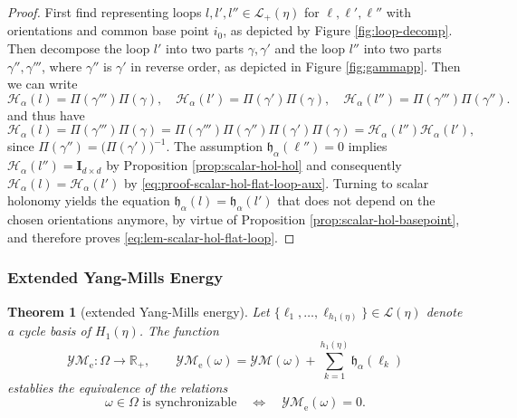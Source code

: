\documentclass[10pt,reqno]{amsart}
\numberwithin{equation}{section}
\theoremstyle{bfnote}
\newtheorem{theorem}{Theorem}[section]
\theoremstyle{bfdef}
\newcommand{\mc}[1]{\mathcal{#1}}
\newcommand{\R}{\mathbb{R}}
\newcommand{\II}{\mathbf{I}_{d \times d}}
\renewcommand\o\operatorname
\providecommand\a; %
\renewcommand{\a}{\alpha}
\providecommand\Hom; %
\renewcommand{\Hom}{H}
\providecommand\Hol; %
\renewcommand{\Hol}{\mc{H}}
\providecommand\Lps; %
\renewcommand{\Lps}{\mc{L}}
\providecommand\hol; %
\renewcommand{\hol}{\mathfrak{h}}
\begin{document}
		\begin{proof}
			First find representing loops $l,l',l'' \in \Lps_{+}(\eta)$ for $\ell,\ell',\ell''$ with orientations and common base point $i_{0}$, as depicted by Figure \ref{fig:loop-decomp}. Then decompose the loop $l'$ into two parts $\gamma,\gamma'$ and the loop $l''$ into two parts $\gamma'',\gamma'''$, where $\gamma''$ is $\gamma'$ in reverse order, as depicted in Figure \ref{fig:gammapp}.
			Then we can write
			\begin{equation}
				\Hol_{\a}(l) = \Pi(\gamma''')\Pi(\gamma), \quad \Hol_{\a}(l') = \Pi(\gamma')\Pi(\gamma), \quad \Hol_{\a}(l'') = \Pi(\gamma''')\Pi(\gamma'').
			\end{equation}
			and thus have
			\begin{equation}\label{eq:proof-scalar-hol-flat-loop-aux}
				\Hol_{\a}(l) = \Pi(\gamma''')\Pi(\gamma) = \Pi(\gamma''')\Pi(\gamma'')\Pi(\gamma')\Pi(\gamma) = \Hol_{\a}(l'') \Hol_{\a}(l'),
			\end{equation}
			since $\Pi(\gamma'') = \big(\Pi(\gamma')\big)^{-1}$. The assumption $\hol_{\a}(\ell'') = 0$ implies $\Hol_{\a}(l'') = \II$ by Proposition \ref{prop:scalar-hol-hol} and consequently $\Hol_{\a}(l) = \Hol_{\a}(l')$ by \eqref{eq:proof-scalar-hol-flat-loop-aux}. Turning to scalar holonomy yields the equation $\hol_{\a}(l) = \hol_{\a}(l')$  that does not depend on the chosen orientations anymore, by virtue of Proposition \ref{prop:scalar-hol-basepoint}, and therefore proves \eqref{eq:lem-scalar-hol-flat-loop}.
		\end{proof}

	\subsubsection{Extended Yang-Mills Energy}
		\begin{theorem}[extended Yang-Mills energy]\label{thm:eym}
			Let $\{\ell_{1},\dotsc,\ell_{h_{1}(\eta)}\} \in \Lps(\eta)$ denote a cycle basis of $\Hom_1(\eta)$. The function
			\begin{equation}
				\mc{YM}_{\o{e}} : \Omega \to \R_+, \qquad \mc{YM}_{\o{e}}(\omega) =
				\mc{YM}(\omega) + \sum_{k=1}^{h_{1}(\eta)} \hol_{\a}(\ell_{k})
			\end{equation}
			establies the equivalence of the relations
			\begin{equation}
				\omega \in \Omega \text{  is synchronizable} \quad\iff\quad \mc{YM}_{\o{e}}(\omega) = 0.
			\end{equation}
		\end{theorem}
\end{document}
